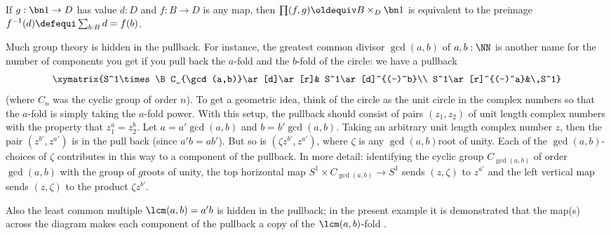 \begin{example}
  If $g:\bn 1\to D$ has value $d:D$ and $f:B\to D$ is any map, then $\prod(f,g)\oldequiv B\times_D\bn 1$ is equivalent to the preimage $f^{-1}(d)\defequi\sum_{b:B}d=f(b)$.
\end{example}
\begin{example}
  \label{ex:pullbackandgcd}
  Much group theory is hidden in the pullback.  For instance, the greatest common divisor $\gcd(a,b)$ of $a,b:\NN$ is another name for the number of components you get if you pull back the $a$-fold and the $b$-fold \coverings of the circle: we %
  have a pullback
$$\xymatrix{S^1\times\B C_{\gcd(a,b)}\ar[d]\ar[r]& S^1\ar[d]^{(-)^b}\\
S^1\ar[r]^{(-)^a}&\,S^1}
$$
(where $C_n$ was the cyclic group of order $n$).
To get a geometric idea, think of the circle as the unit circle in the complex numbers so that the $a$-fold \covering is simply taking the $a$-fold power.  With this setup, the pullback should consist of pairs $(z_1,z_2)$ of unit length complex numbers with the property that $z_1^a=z_2^b$.  Let $a=a'\gcd(a,b)$ and $b=b'\gcd(a,b)$. Taking an arbitrary unit length complex number $z$, then the pair $(z^{b'},z^{a'})$ is in the pull back (since $a'b=ab'$).  But so is $(\zeta z^{b'},z^{a'})$, where $\zeta$ is any $\gcd(a,b)$\th root of unity.  Each of the $\gcd(a,b)$-choices of $\zeta$ contributes in this way to a component of the pullback.  In more detail: identifying the cyclic group $C_{\gcd(a,b)}$ of order $\gcd(a,b)$ with the group of $g$\th roots of unity, the top horizontal map $S^1\times C_{\gcd(a,b)}\to S^1$ sends $(z,\zeta)$ to $z^{a'}$ and the left vertical map sends $(z,\zeta)$ to the product $\zeta z^{b'}$.

Also the least common multiple $\lcm(a,b)=a'b$ is hidden in the pullback; in the present example it is demonstrated that the map(s) across the diagram makes each component of the pullback a copy of the $\lcm(a,b)$-fold \covering.
\end{example}


